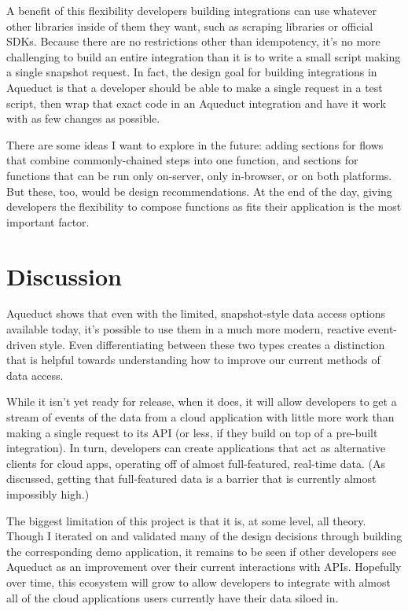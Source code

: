 \documentclass[manuscript,review,anonymous]{acmart}
\begin{document}
A benefit of this flexibility developers building integrations can use whatever other libraries inside of them they want, such as scraping libraries or official SDKs. Because there are no restrictions other than idempotency, it's no more challenging to build an entire integration than it is to write a small script making a single snapshot request. In fact, the design goal for building integrations in Aqueduct is that a developer should be able to make a single request in a test script, then wrap that exact code in an Aqueduct integration and have it work with as few changes as possible.

There are some ideas I want to explore in the future: adding sections for flows that combine commonly-chained steps into one function, and sections for functions that can be run only on-server, only in-browser, or on both platforms. But these, too, would be design recommendations. At the end of the day, giving developers the flexibility to compose functions as fits their application is the most important factor. 

\section{Discussion}
Aqueduct shows that even with the limited, snapshot-style data access options available today, it's possible to use them in a much more modern, reactive event-driven style. Even differentiating between these two types creates a distinction that is helpful towards understanding how to improve our current methods of data access.

While it isn't yet ready for release, when it does, it will allow developers to get a stream of events of the data from a cloud application with little more work than making a single request to its API (or less, if they build on top of a pre-built integration). In turn, developers can create applications that act as alternative clients for cloud apps, operating off of almost full-featured, real-time data. (As discussed, getting that full-featured data is a barrier that is currently almost impossibly high.)

The biggest limitation of this project is that it is, at some level, all theory. Though I iterated on and validated many of the design decisions through building the corresponding demo application, it remains to be seen if other developers see Aqueduct as an improvement over their current interactions with APIs. Hopefully over time, this ecosystem will grow to allow developers to integrate with almost all of the cloud applications users currently have their data siloed in.
\end{document}
